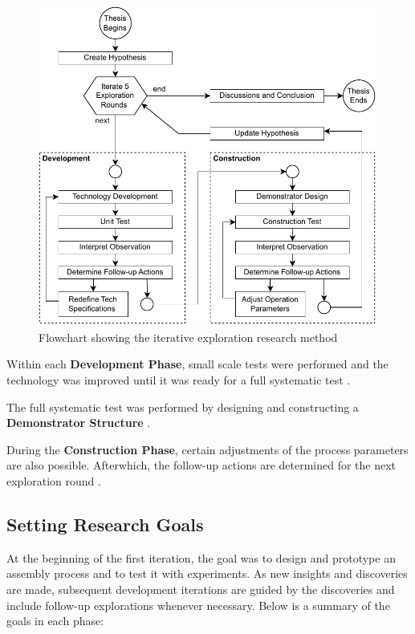 \FloatBarrier
\begin{figure}[h]
    \centering
    \includegraphics[width=0.99\textwidth]{images/03/Research by Iterative Exploration.pdf}
    \caption{Flowchart showing the iterative exploration research method}
    \label{fig:thesis-exploration-flowchart}
\end{figure}
\FloatBarrier

Within each \textbf{Development Phase}, small scale tests were performed and the technology was improved until it was ready for a full systematic test . 

The full systematic test was performed by designing and constructing a \textbf{Demonstrator Structure} . 

During the \textbf{Construction Phase}, certain adjustments of the process parameters are also possible. Afterwhich, the follow-up actions are determined for the next exploration round .

\subsection{Setting Research Goals}
\label{subsection:methodology-setting-research-goals}

At the beginning of the first iteration, the goal was to design and prototype an assembly process and to test it with experiments. As new insights and discoveries are made, subsequent development iterations are guided by the discoveries and include follow-up explorations whenever necessary. Below is a summary of the goals in each phase:

